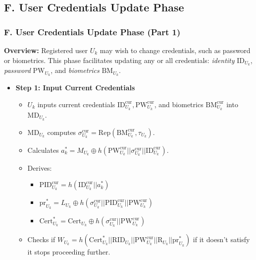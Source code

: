 \documentclass[9pt,handout]{beamer}
\begin{document}
\subsection{F. User Credentials Update Phase}
\begin{frame}
    \frametitle{F. User Credentials Update Phase (Part 1)}

    \textbf{Overview:} Registered user \( U_k \) may wish to change credentials, such as password or biometrics. This phase facilitates updating any or all credentials: \emph{identity} \( \text{ID}_{U_k} \), \emph{password} \( \text{PW}_{U_k} \), and \emph{biometrics} \( \text{BM}_{U_k} \).

    \begin{itemize}
        \item \textbf{Step 1: Input Current Credentials}
        \begin{itemize}
            \item \( U_k \) inputs current credentials \( \text{ID}_{U_k}^{\text{cur}}, \text{PW}_{U_k}^{\text{cur}} \), and biometrics \( \text{BM}_{U_k}^{\text{cur}} \) into \( \text{MD}_{U_k} \).
            \item \( \text{MD}_{U_k} \) computes \( \sigma_{U_k}^{\text{cur}} = \text{Rep}(\text{BM}_{U_k}^{\text{cur}}, \tau_{U_k}) \).
            \item Calculates \( a^*_k = M_{U_k} \oplus h(\text{PW}_{U_k}^{\text{cur}} || \sigma_{U_k}^{\text{cur}} || \text{ID}_{U_k}^{\text{cur}}) \).
            \item Derives:
            \begin{itemize}
                \item \( \text{PID}_{U_k}^{\text{cur}} = h(\text{ID}_{U_k}^{\text{cur}} ||  a^*_k) \)
                \item \( \text{pr}_{U_k}^* = L_{U_k} \oplus h(\sigma_{U_k}^{\text{cur}} || \text{PID}_{U_k}^{\text{cur}} || \text{PW}_{U_k}^{\text{cur}} ) \)
                \item \( \text{Cert}_{U_k}^* = \text{Cert}_{U_k} \oplus h(\sigma_{U_k}^{\text{cur}}  || \text{PW}_{U_k}^{\text{cur}}) \)
            \end{itemize}
            \item Checks if \( W_{U_k} = h(\text{Cert}_{U_k}^* || \text{RID}_{U_k} || \text{PW}_{U_k}^{\text{cur}} || \text{R}_{U_k} || \text{pr}_{U_k}^*) \) if it doesn't satisfy it stops proceeding further.
        \end{itemize}
        
       
    \end{itemize}
    
    \vspace{0.5em}
\end{frame}
\end{document}
